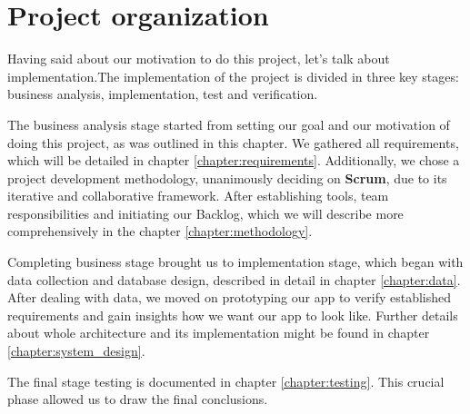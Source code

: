     \section{Project organization}
    
    Having said about our motivation to do this project, let's talk about implementation.The implementation of the project is divided in three key stages: business analysis, implementation, test and verification. 
    \par
    The business analysis stage started from setting our goal and our motivation of doing this project, as was outlined in this chapter.  We gathered all requirements, which will be detailed in chapter \ref{chapter:requirements}. Additionally, we chose a project development methodology, unanimously deciding on \textbf{Scrum}, due to its iterative and collaborative framework. After establishing tools, team responsibilities and initiating our Backlog, which we will describe more comprehensively in the chapter \ref{chapter:methodology}.
    \par
    Completing business stage brought us to implementation stage, which began with data collection and database design, described in detail in chapter \ref{chapter:data}. After dealing with data, we moved on prototyping our app to verify established requirements and gain insights how we want our app to look like. Further details about whole architecture and its implementation might be found in chapter \ref{chapter:system_design}.
    \par
    The final stage testing is documented in chapter \ref{chapter:testing}. This crucial phase allowed us to draw the final conclusions.